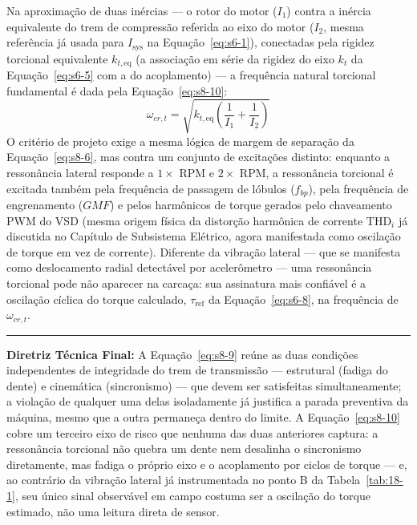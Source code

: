 \documentclass[12pt,a4paper]{article}
\numberwithin{equation}{section}
\numberwithin{table}{section}
\numberwithin{figure}{section}
\begin{document}
	Na aproximação de duas inércias — o rotor do motor ($I_1$) contra a inércia equivalente do trem de compressão referida ao eixo do motor ($I_2$, mesma referência já usada para $I_{\text{sys}}$ na Equação~\eqref{eq:s6-1}), conectadas pela rigidez torcional equivalente $k_{t,\text{eq}}$ (a associação em série da rigidez do eixo $k_t$ da Equação~\eqref{eq:s6-5} com a do acoplamento) — a frequência natural torcional fundamental é dada pela Equação~\eqref{eq:s8-10}:
	\begin{equation}\label{eq:s8-10}
 \omega_{cr,t} = \sqrt{k_{t,\text{eq}} \left( \frac{1}{I_1} + \frac{1}{I_2} \right)}
\end{equation}
	O critério de projeto exige a mesma lógica de margem de separação da Equação~\eqref{eq:s8-6}, mas contra um conjunto de excitações distinto: enquanto a ressonância lateral responde a $1\times$ RPM e $2\times$ RPM, a ressonância torcional é excitada também pela frequência de passagem de lóbulos ($f_{bp}$), pela frequência de engrenamento ($GMF$) e pelos harmônicos de torque gerados pelo chaveamento PWM do VSD (mesma origem física da distorção harmônica de corrente $\text{THD}_i$ já discutida no Capítulo de Subsistema Elétrico, agora manifestada como oscilação de torque em vez de corrente). Diferente da vibração lateral — que se manifesta como deslocamento radial detectável por acelerômetro — uma ressonância torcional pode não aparecer na carcaça: sua assinatura mais confiável é a oscilação cíclica do torque calculado, $\tau_{\text{ref}}$ da Equação~\eqref{eq:s6-8}, na frequência de $\omega_{cr,t}$.

	\vspace{1em}
	\hrule
	\vspace{1em}

	\textbf{Diretriz Técnica Final:} A Equação~\eqref{eq:s8-9} reúne as duas condições independentes de integridade do trem de transmissão — estrutural (fadiga do dente) e cinemática (sincronismo) — que devem ser satisfeitas simultaneamente; a violação de qualquer uma delas isoladamente já justifica a parada preventiva da máquina, mesmo que a outra permaneça dentro do limite. A Equação~\eqref{eq:s8-10} cobre um terceiro eixo de risco que nenhuma das duas anteriores captura: a ressonância torcional não quebra um dente nem desalinha o sincronismo diretamente, mas fadiga o próprio eixo e o acoplamento por ciclos de torque — e, ao contrário da vibração lateral já instrumentada no ponto B da Tabela~\ref{tab:18-1}, seu único sinal observável em campo costuma ser a oscilação do torque estimado, não uma leitura direta de sensor.
\end{document}
